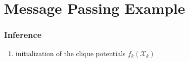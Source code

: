 \section{Message Passing Example}




\begin{frame} \frametitle{Inference}
	\begin{enumerate}
		\item<1-> initialization of the clique potentials $f_k(\mathcal X_k)$
\end{enumerate}
\end{frame}
